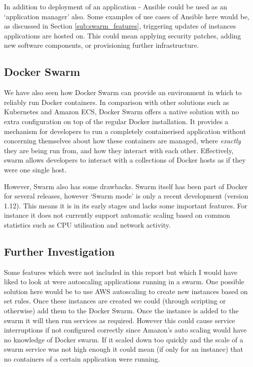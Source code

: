 \documentclass{article}
\begin{document}
In addition to deployment of an application - Ansible could be used as an `application manager' also. Some examples of use cases of Ansible here would be, as discussed in Section \ref{sub:swarm_features}, triggering updates of instances applications are hosted on. This could mean applying security patches, adding new software components, or provisioning further infrastructure.

\subsection{Docker Swarm}
We have also seen how Docker Swarm can provide an environment in which to reliably run Docker containers. In comparison with other solutions such as Kubernetes and Amazon ECS, Docker Swarm offers a native solution with no extra configuration on top of the regular Docker installation. It provides a mechanism for developers to run a completely containerised application without concerning themselves about how these containers are managed, where \textit{exactly} they are being run from, and how they interact with each other. Effectively, swarm allows developers to interact with a collections of Docker hosts as if they were one single host.

However, Swarm also has some drawbacks. Swarm itself has been part of Docker for several releases, however `Swarm mode' is only a recent development (version 1.12). This means it is in its early stages and lacks some important features. For instance it does not currently support automatic scaling based on common statistics such as CPU utilisation and network activity. 

\subsection{Further Investigation}
Some features which were not included in this report but which I would have liked to look at were autoscaling applications running in a swarm. One possible solution here would be to use AWS autoscaling to create new instances based on set rules. Once these instances are created we could (through scripting or otherwise) add them to the Docker Swarm. Once the instance is added to the swarm it will then run services as required. However this could cause service interruptions if not configured correctly since Amazon's auto scaling would have no knowledge of Docker swarm. If it scaled down too quickly and the scale of a swarm service was not high enough it could mean (if only for an instance) that no containers of a certain application were running. 
\end{document}
